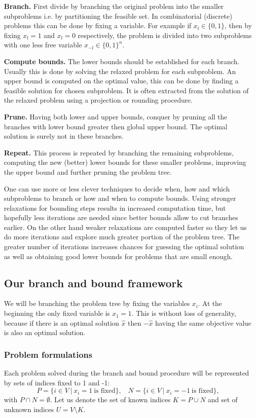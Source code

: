 \documentclass[12pt]{book}
\theoremstyle{definition}
\begin{document}
\textbf{Branch.} First divide by branching the original problem into the smaller subproblems i.e. by partitioning the feasible set. 
 In combinatorial (discrete) problems this can be done by fixing a variable. For example if $x_l \in \{0,1\}$, then by fixing $x_l=1$ and $x_l=0$ respectively, the problem is divided into two subproblems with one less free variable $x_{-l} \in \{0,1\}^n.$


\textbf{Compute bounds.} The lower bounds should be established for each branch. Usually this is done by solving the relaxed problem for each subproblem. 
An upper bound is computed on the optimal value, this can be done by finding a feasible solution for chosen subproblem. It is often extracted from the solution of the relaxed problem using a projection or rounding procedure.

\textbf{Prune.} Having both lower and upper bounds, conquer by pruning all the branches with lower bound greater then global upper bound. The optimal solution is surely not in these branches.

\textbf{Repeat.} This process is repeated by branching the remaining subproblems, computing the new (better) lower bounds for these smaller problems, improving the upper bound and further pruning the problem tree.

One can use more or less clever techniques to decide when, how and which subproblems to branch or how and when to compute bounds.
Using stronger relaxations for bounding steps results in increased computation time, but hopefully less iterations are needed since better bounds allow to cut branches earlier.  On the other hand weaker relaxations are computed faster so they let us do more iterations and explore much greater portion of the problem tree. The greater number of iterations increases chances for guessing the optimal solution as well as obtaining good lower bounds for problems that are small enough.

\subsection{Our branch and bound framework}

We will be branching the problem tree by fixing the variables $x_i$.
At the beginning the only fixed variable is $x_1=1$. This is without loss of generality, because if there is an optimal solution $\hat{x}$ then $-\hat{x}$ having the same objective value is also an optimal solution. 


\subsubsection{Problem formulations}
Each problem solved during the branch and bound procedure will be represented by sets of indices fixed to 1 and -1:  
$$P = \{i\in V \ \vert \ x_i =1 \ \mbox{is fixed} \}, \ \ \ \
N = \{i\in V \ \vert \ x_i =-1 \  \mbox{is fixed} \}, $$
with $P\cap N = \emptyset.$ 
Let us denote the set of known indices $K = P\cup N$ and set of unknown indices $U = V\setminus K$. 
\end{document}

